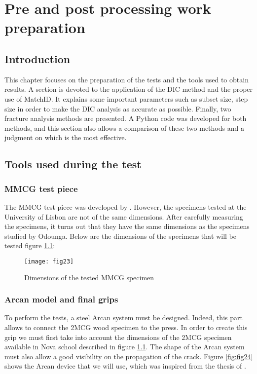 \chapter{Pre and post processing work preparation}
\label{Chapter2}

\section{Introduction}

This chapter focuses on the preparation of the tests and the tools used to obtain results. A section is devoted to the application of the DIC method and the proper use of MatchID. It explains some important parameters such as subset size, step size in order to make the DIC analysis as accurate as possible.
Finally, two fracture analysis methods are presented. A Python code was developed for both methods, and this section also allows a comparison of these two methods and a judgment on which is the most effective.

\section{Tools used during the test}

\subsection{MMCG test piece}

The MMCG test piece was developed by \cite{MoutouPitti2008}. However, the specimens tested at the University of Lisbon are not of the same dimensions. After carefully measuring the specimens, it turns out that they have the same dimensions as the specimens studied by Odounga. Below are the dimensions of the specimens that will be tested figure \ref{fig:fig23}:


\begin{figure}[htp]
	\centering
	\texttt{[image: fig23]}
	\caption{Dimensions of the tested MMCG specimen}
	\label{fig:fig23}
\end{figure}

\subsection{Arcan model and final grips}

To perform the tests, a steel Arcan system must be designed. Indeed, this part allows to connect the 2MCG wood specimen to the press. In order to create this grip we must first take into account the dimensions of the 2MCG specimen available in Nova school described in figure \ref{fig:fig23}. The shape of the Arcan system must also allow a good visibility on the propagation of the crack. Figure \ref{fig:fig24} shows the Arcan device that we will use, which was inspired from the thesis of \cite{Odounga2018phd}.


